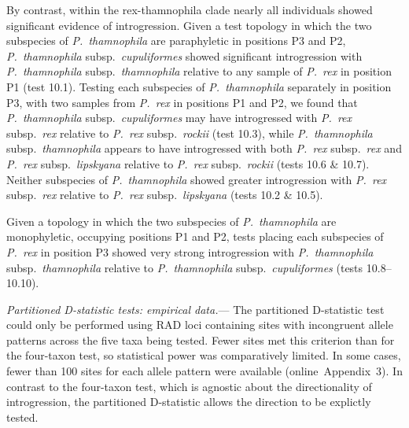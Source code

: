 \documentclass[12pt,letterpaper]{article}
\renewcommand{\subsubsection}[1]{%
\vspace{2ex}
\noindent
\textit{#1.}---}
\begin{document}
By contrast, within the rex-thamnophila clade nearly all individuals
showed significant evidence of introgression. Given a test topology in
which the two subspecies of \emph{P.~thamnophila} are paraphyletic in
positions P3 and P2, \emph{P.~thamnophila} subsp.\ \emph{cupuliformes}
showed significant introgression with \emph{P.~thamnophila} subsp.\
\emph{thamnophila} relative to any sample of \emph{P.~rex} in position
P1 (test 10.1). Testing each subspecies of \emph{P.~thamnophila}
separately in position P3, with two samples from \emph{P.~rex} in
positions P1 and P2, we found that \emph{P.~thamnophila} subsp.\
\emph{cupuliformes} may have introgressed with \emph{P.~rex} subsp.\
\emph{rex} relative to \emph{P.~rex} subsp.\ \emph{rockii} (test
10.3), while \emph{P.~thamnophila} subsp.\ \emph{thamnophila} appears
to have introgressed with both \emph{P.~rex} subsp.\ \emph{rex} and
\emph{P.~rex} subsp.\ \emph{lipskyana} relative to \emph{P.~rex}
subsp.\ \emph{rockii} (tests 10.6 \& 10.7). Neither subspecies of
\emph{P.~thamnophila} showed greater introgression with \emph{P.~rex}
subsp.\ \emph{rex} relative to \emph{P.~rex} subsp.\ \emph{lipskyana}
(tests 10.2 \& 10.5).

Given a topology in which the two subspecies of \emph{P.~thamnophila}
are monophyletic, occupying positions P1 and P2, tests placing each
subspecies of \emph{P.~rex} in position P3 showed very strong
introgression with \emph{P.~thamnophila} subsp.\ \emph{thamnophila} 
relative to \emph{P.~thamnophila} subsp.\ \emph{cupuliformes}
(tests 10.8--10.10).

\subsubsection{Partitioned D-statistic tests: empirical data}
The partitioned D-statistic test could only be performed using RAD
loci containing sites with incongruent allele patterns across the five
taxa being tested. Fewer sites met this criterion than for the
four-taxon test, so statistical power was comparatively limited. In
some cases, fewer than 100 sites for each allele pattern were
available (online~Appendix~3). In contrast to the four-taxon test, which is
agnostic about the directionality of introgression, the partitioned
D-statistic allows the direction to be explictly tested.
\end{document}
